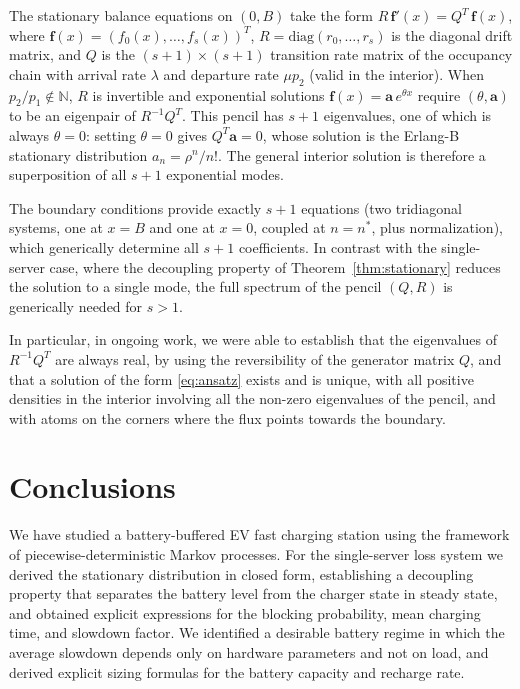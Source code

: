 \documentclass{sig-alternate-per-modified}
\begin{document}
The stationary balance equations on $(0,B)$ take the form $R\,\mathbf{f}'(x) = Q^T\,\mathbf{f}(x)$,
where $\mathbf{f}(x) = (f_0(x),\ldots,f_s(x))^T$, $R = \mathrm{diag}(r_0,\ldots,r_s)$
is the diagonal drift matrix, and $Q$ is the $(s+1)\times(s+1)$ transition rate matrix
of the occupancy chain with arrival rate $\lambda$ and departure rate $\mu p_2$ (valid in the interior). 
When $p_2/p_1 \notin \mathbb{N}$, $R$ is invertible and exponential solutions $\mathbf{f}(x) = \mathbf{a}\,e^{\theta x}$
require $(\theta,\mathbf{a})$ to be an eigenpair of $R^{-1}Q^T$. This pencil has $s+1$ eigenvalues, one of which is
always $\theta = 0$: setting $\theta=0$ gives $Q^T\mathbf{a}=0$, whose solution is the
Erlang-B stationary distribution $a_n = \rho^n/n!$. The general interior solution is
therefore a superposition of all $s+1$ exponential modes.

The boundary conditions provide exactly $s+1$ equations (two tridiagonal systems, one
at $x=B$ and one at $x=0$, coupled at $n=n^*$, plus normalization), which generically
determine all $s+1$ coefficients. In contrast with the single-server case, where the
decoupling property of Theorem~\ref{thm:stationary} reduces the solution to a single
mode, the full spectrum of the pencil $(Q,R)$ is generically needed for $s>1$.

In particular, in ongoing work, we were able to establish that the eigenvalues of $R^{-1}Q^T$ are always real, by using the reversibility of the generator matrix $Q$, and that a solution of the form \eqref{eq:ansatz} exists and is unique, with all positive densities in the interior involving all the non-zero eigenvalues of the pencil, and with atoms on the corners where the flux points towards the boundary.


\section{Conclusions}
\label{sec:conclusions}

We have studied a battery-buffered EV fast charging station using the framework of
piecewise-deterministic Markov processes. For the single-server loss system we derived
the stationary distribution in closed form, establishing a decoupling property that
separates the battery level from the charger state in steady state, and obtained explicit
expressions for the blocking probability, mean charging time, and slowdown factor. We
identified a desirable battery regime in which the average slowdown depends
only on hardware parameters and not on load, and derived explicit sizing formulas for
the battery capacity and recharge rate.
\end{document}
